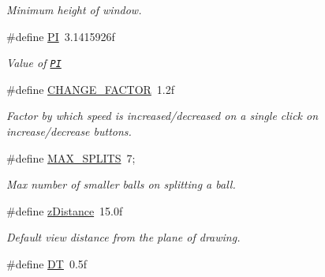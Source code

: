 \begin{DoxyCompactItemize}
\begin{DoxyCompactList}\small\item\em Minimum height of window. \end{DoxyCompactList}\item 
\hypertarget{group___d_e_f_i_n_e_ga598a3330b3c21701223ee0ca14316eca}{\#define \hyperlink{group___d_e_f_i_n_e_ga598a3330b3c21701223ee0ca14316eca}{P\-I}~3.\-1415926f}\label{group___d_e_f_i_n_e_ga598a3330b3c21701223ee0ca14316eca}

\begin{DoxyCompactList}\small\item\em Value of \href{http://en.wikipedia.org/wiki/Pi}{\tt P\-I} \end{DoxyCompactList}\item 
\hypertarget{group___d_e_f_i_n_e_gab93c45e95c408a9ab17a501275bc62fb}{\#define \hyperlink{group___d_e_f_i_n_e_gab93c45e95c408a9ab17a501275bc62fb}{C\-H\-A\-N\-G\-E\-\_\-\-F\-A\-C\-T\-O\-R}~1.\-2f}\label{group___d_e_f_i_n_e_gab93c45e95c408a9ab17a501275bc62fb}

\begin{DoxyCompactList}\small\item\em Factor by which speed is increased/decreased on a single click on increase/decrease buttons. \end{DoxyCompactList}\item 
\hypertarget{group___d_e_f_i_n_e_ga1316e2e8c9434231dfeeb62dff9c7252}{\#define \hyperlink{group___d_e_f_i_n_e_ga1316e2e8c9434231dfeeb62dff9c7252}{M\-A\-X\-\_\-\-S\-P\-L\-I\-T\-S}~7;}\label{group___d_e_f_i_n_e_ga1316e2e8c9434231dfeeb62dff9c7252}

\begin{DoxyCompactList}\small\item\em Max number of smaller balls on splitting a ball. \end{DoxyCompactList}\item 
\hypertarget{group___d_e_f_i_n_e_gaeb58f5e1ee76192500493fe94c3ab80b}{\#define \hyperlink{group___d_e_f_i_n_e_gaeb58f5e1ee76192500493fe94c3ab80b}{z\-Distance}~15.\-0f}\label{group___d_e_f_i_n_e_gaeb58f5e1ee76192500493fe94c3ab80b}

\begin{DoxyCompactList}\small\item\em Default view distance from the plane of drawing. \end{DoxyCompactList}\item 
\hypertarget{group___d_e_f_i_n_e_ga943f07034774ef1261d62cd0d3d1fec9}{\#define \hyperlink{group___d_e_f_i_n_e_ga943f07034774ef1261d62cd0d3d1fec9}{D\-T}~0.\-5f}\label{group___d_e_f_i_n_e_ga943f07034774ef1261d62cd0d3d1fec9}


\end{DoxyCompactItemize}
